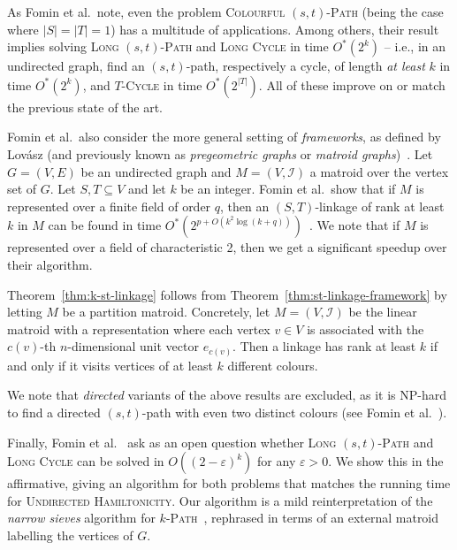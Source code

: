 \documentclass[10pt,a4paper]{article}
\makeatletter
\newcommand{\cI}{\ensuremath{\mathcal I}\xspace}
\newcommand\IfRestateTF{%
  \ifx\label\thmt@gobble@label %
    \expandafter\@firstoftwo
  \else
    \expandafter\@secondoftwo
  \fi
}
\newcommand{\RestateRemark}{\IfRestateTF{{\normalfont\bfseries (Restated) }}{}}
\makeatother
\begin{document}
As Fomin et al.\ note, even the problem \textsc{Colourful $(s,t)$-Path}
(being the case where $|S|=|T|=1$) has a multitude of applications.
Among others, their result implies solving \textsc{Long $(s,t)$-Path} and
\textsc{Long Cycle} in time $O^*(2^k)$ -- i.e., in an undirected
graph, find an $(s,t)$-path, respectively a cycle, of length \emph{at least} 
$k$ in time $O^*(2^k)$, and \textsc{$T$-Cycle} in time $O^*(2^{|T|})$.
All of these improve on or match the previous state of the art.

Fomin et al.\ also consider the more general setting of \emph{frameworks},
as defined by Lov\'asz (and previously known as
\emph{pregeometric graphs} or \emph{matroid graphs})~\cite{FominGKSS24,Lovasz1977,LovaszGeomBook2019}.
Let $G=(V,E)$ be an undirected graph and $M=(V,\cI)$ a matroid over
the vertex set of $G$. Let $S, T \subseteq V$ and let $k$ be an integer. 
Fomin et al.\ show that if $M$ is represented over a finite field of order $q$, 
then an $(S,T)$-linkage of rank at least $k$ in $M$ can be found in
time $O^*(2^{p+O(k^2 \log (k+q))})$~\cite{FominGKSS24}.
We note that if $M$ is represented over a field of characteristic 2,
then we get a significant speedup over their algorithm.


Theorem~\ref{thm:k-st-linkage} follows from
Theorem~\ref{thm:st-linkage-framework} by letting $M$ be a partition matroid.
Concretely, let $M=(V, \cI)$ be the linear matroid with a
representation where each vertex $v \in V$ is associated with the
$c(v)$-th $n$-dimensional unit vector $e_{c(v)}$.
Then a linkage has rank at least $k$ if and only if it visits vertices
of at least $k$ different colours.

We note that \emph{directed} variants of the above results are
excluded, as it is NP-hard to find a directed $(s,t)$-path with even two
distinct colours (see Fomin et al.~\cite{FominGKSS24}).

Finally, Fomin et al.~\cite{FominGKSS24} ask as an open question
whether \textsc{Long $(s,t)$-Path} and \textsc{Long Cycle} can
be solved in $O((2-\varepsilon)^k)$ for any $\varepsilon > 0$.
We show this in the affirmative, giving an algorithm for both problems
that matches the running time for \textsc{Undirected Hamiltonicity}.
Our algorithm is a mild reinterpretation of the \emph{narrow sieves}
algorithm for \textsc{$k$-Path}~\cite{BjorklundHKK17narrow}, rephrased
in terms of an external matroid labelling the vertices of $G$.
\end{document}
